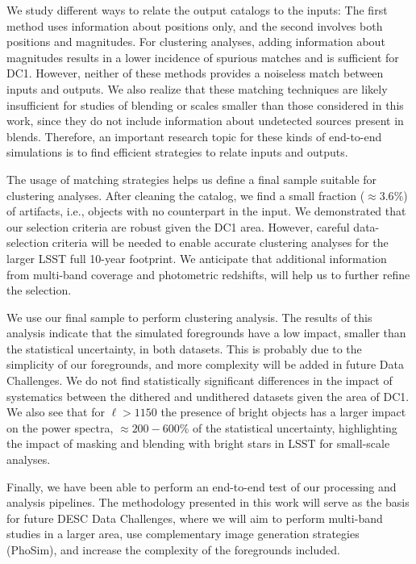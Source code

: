 \documentclass[a4paper,fleqn,usenatbib]{mnras}
\begin{document}
We study different ways to relate the output catalogs to the inputs: The first method uses information about positions only, and the second involves both positions and magnitudes. For clustering analyses, adding information about magnitudes results in a lower incidence of spurious matches and is sufficient for DC1. However, neither of these methods provides a noiseless match between inputs and outputs. We also realize that these matching techniques are likely insufficient for studies of blending or scales smaller than those considered in this work, since they do not include information about undetected sources present in blends. Therefore, an important research topic for these kinds of end-to-end simulations is to find efficient strategies to relate inputs and outputs. 

The usage of matching strategies helps us define a final sample suitable for clustering analyses. After cleaning the catalog, we find a small fraction ($\approx 3.6\%$) of artifacts, i.e., objects with no counterpart in the input. We demonstrated that our selection criteria are robust given the DC1 area. However, careful data-selection criteria will be needed to enable accurate clustering analyses for the larger LSST full 10-year footprint. We anticipate that additional information from multi-band coverage and photometric redshifts, will help us to further refine the selection.

We use our final sample to perform clustering analysis. The results of this analysis indicate that the simulated foregrounds have a low impact, smaller than the statistical uncertainty, in both datasets. This is probably due to the simplicity of our foregrounds, and more complexity will be added in future Data Challenges. We do not find statistically significant differences in the impact of systematics between the dithered and undithered datasets given the area of DC1. We also see that for $\ell > 1150$ the presence of bright objects has a larger impact on the power spectra, $\approx 200-600\%$ of the statistical uncertainty, highlighting the impact of masking and blending with bright stars in LSST for small-scale analyses.

Finally, we have been able to perform an end-to-end test of our processing and analysis pipelines. The methodology presented in this work will serve as the basis for future DESC Data Challenges, where we will aim to perform multi-band studies in a larger area, use complementary image generation strategies (PhoSim), and increase the complexity of the foregrounds included.
\end{document}
